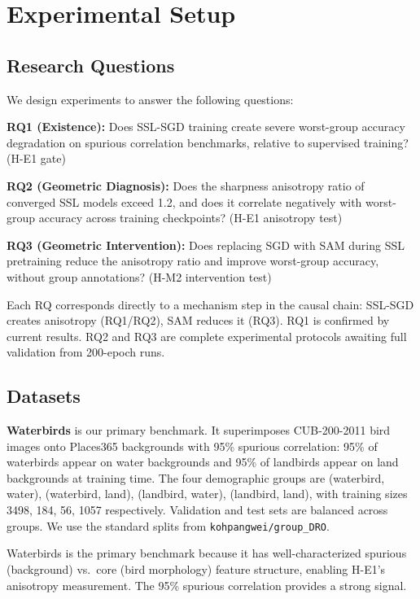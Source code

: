 \section{Experimental Setup}
\label{sec:exp}

\subsection{Research Questions}

We design experiments to answer the following questions:

\textbf{RQ1 (Existence):} Does SSL-SGD training create severe worst-group accuracy degradation on spurious correlation benchmarks, relative to supervised training? (H-E1 gate)

\textbf{RQ2 (Geometric Diagnosis):} Does the sharpness anisotropy ratio of converged SSL models exceed 1.2, and does it correlate negatively with worst-group accuracy across training checkpoints? (H-E1 anisotropy test)

\textbf{RQ3 (Geometric Intervention):} Does replacing SGD with SAM during SSL pretraining reduce the anisotropy ratio and improve worst-group accuracy, without group annotations? (H-M2 intervention test)

Each RQ corresponds directly to a mechanism step in the causal chain: SSL-SGD creates anisotropy (RQ1/RQ2), SAM reduces it (RQ3). RQ1 is confirmed by current results. RQ2 and RQ3 are complete experimental protocols awaiting full validation from 200-epoch runs.

\subsection{Datasets}

\textbf{Waterbirds} \citep{sagawa2019dro} is our primary benchmark. It superimposes CUB-200-2011 bird images onto Places365 backgrounds with 95\% spurious correlation: 95\% of waterbirds appear on water backgrounds and 95\% of landbirds appear on land backgrounds at training time. The four demographic groups are (waterbird, water), (waterbird, land), (landbird, water), (landbird, land), with training sizes 3498, 184, 56, 1057 respectively. Validation and test sets are balanced across groups. We use the standard splits from \texttt{kohpangwei/group\_DRO}.

Waterbirds is the primary benchmark because it has well-characterized spurious (background) vs.\ core (bird morphology) feature structure, enabling H-E1's anisotropy measurement. The 95\% spurious correlation provides a strong signal.

